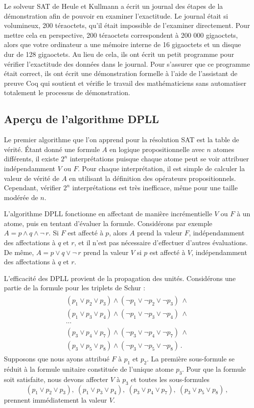 Le solveur SAT de Heule et Kullmann a écrit un journal des étapes de la démonstration afin de pouvoir en examiner l'exactitude. Le journal était si volumineux, 200 téraoctets, qu'il était impossible de l'examiner directement. Pour mettre cela en perspective, 200 téraoctets correspondent à 200 000 gigaoctets, alors que votre ordinateur a une mémoire interne de 16 gigaoctets et un disque dur de 128 gigaoctets. Au lieu de cela, ils ont écrit un petit programme pour vérifier l'exactitude des données dans le journal. Pour s'assurer que ce programme était correct, ils ont écrit une démonstration formelle à l'aide de l'assistant de preuve Coq qui soutient et vérifie le travail des mathématiciens sans automatiser totalement le processus de démonstration.

\subsection{Aperçu de l'algorithme DPLL}

Le premier algorithme que l'on apprend pour la résolution SAT est la table de vérité. Étant donné une formule $A$ en logique propositionnelle avec $n$ atomes différents, il existe $2^n$ interprétations puisque chaque atome peut se voir attribuer indépendamment $V$ ou $F$. Pour chaque interprétation, il est simple de calculer la valeur de vérité de $A$ en utilisant la définition des opérateurs propositionnels. Cependant, vérifier $2^n$ interprétations est très inefficace, même pour une taille modérée de $n$.

L'algorithme DPLL fonctionne en affectant de manière incrémentielle $V$ ou $F$ à un atome, puis en tentant d'évaluer la formule. Considérons par exemple $A=p \wedge q \wedge \neg\, r$. Si $F$ est affecté à $p$, alors $A$ prend la valeur $F$, indépendamment des affectations à $q$ et $r$, et il n'est pas nécessaire d'effectuer d'autres évaluations. De même, $A=p\vee q \vee \neg\, r$ prend la valeur $V$ si $p$ est affecté à $V$, indépendamment des affectations à $q$ et $r$.

L'efficacité des DPLL provient de la propagation des unités. Considérons une partie de la formule pour les triplets de Schur :
\begin{align}
\begin{array}{l}\label{eq.schur3}
(p_1 \vee p_2 \vee p_3) \wedge (\neg p_1 \vee \neg p_2 \vee \neg p_3) \:\wedge \\
(p_1 \vee p_3 \vee p_4) \wedge (\neg p_1 \vee \neg p_3 \vee \neg p_4) \:\wedge \\
\cdots\\
(p_3 \vee p_4 \vee p_7) \wedge (\neg p_3 \vee \neg p_4 \vee \neg p_7) \:\wedge \\
(p_3 \vee p_5 \vee p_8) \wedge (\neg p_3 \vee \neg p_5 \vee \neg p_8)\,.
\end{array}
\end{align}
Supposons que nous ayons attribué $F$ à $p_1$ et $p_2$. La première sous-formule se réduit à la formule unitaire constituée de l'unique atome $p_3$. Pour que la formule soit satisfaite, nous devons affecter $V$ à $p_3$ et  toutes les sous-formules 
\[
(p_1 \vee p_2 \vee p_3),\;(p_1 \vee p_3 \vee p_4),\;
(p_3 \vee p_4 \vee p_7),\;(p_3 \vee p_5 \vee p_8)\,,
\]
prennent immédiatement la valeur $V$.

